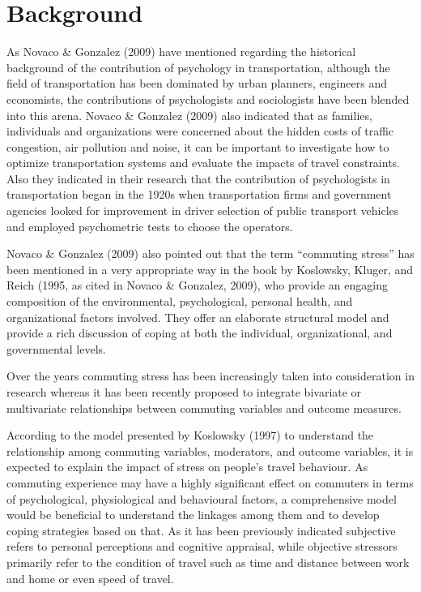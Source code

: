 \documentclass[
11pt, %
oneside, %
english, %
singlespacing, %
]{macthesis} %
\begin{document}
\hypertarget{background}{%
\section{Background}\label{background}}

As Novaco \& Gonzalez (2009) have mentioned regarding the historical background of the contribution of psychology in transportation, although the field of transportation has been dominated by urban planners, engineers and economists, the contributions of psychologists and sociologists have been blended into this arena. Novaco \& Gonzalez (2009) also indicated that as families, individuals and organizations were concerned about the hidden costs of traffic congestion, air pollution and noise, it can be important to investigate how to optimize transportation systems and evaluate the impacts of travel constraints. Also they indicated in their research that the contribution of psychologists in transportation began in the 1920s when transportation firms and government agencies looked for improvement in driver selection of public transport vehicles and employed psychometric tests to choose the operators.

Novaco \& Gonzalez (2009) also pointed out that the term ``commuting stress'' has been mentioned in a very appropriate way in the book by Koslowsky, Kluger, and Reich (1995, as cited in Novaco \& Gonzalez, 2009), who provide an engaging composition of the environmental, psychological, personal health, and organizational factors involved. They offer an elaborate structural model and provide a rich discussion of coping at both the individual, organizational, and governmental levels.

Over the years commuting stress has been increasingly taken into consideration in research whereas it has been recently proposed to integrate bivariate or multivariate relationships between commuting variables and outcome measures.

According to the model presented by Koslowsky (1997) to understand the relationship among commuting variables, moderators, and outcome variables, it is expected to explain the impact of stress on people's travel behaviour. As commuting experience may have a highly significant effect on commuters in terms of psychological, physiological and behavioural factors, a comprehensive model would be beneficial to understand the linkages among them and to develop coping strategies based on that. As it has been previously indicated subjective refers to personal perceptions and cognitive appraisal, while objective stressors primarily refer to the condition of travel such as time and distance between work and home or even speed of travel.
\end{document}
